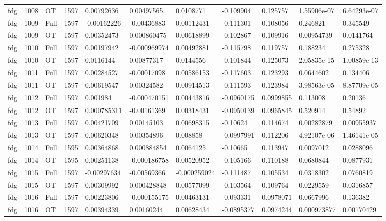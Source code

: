 \begin{landscape}
\begin{longtable}{lllllllllll}
fdg & 1008 & OT & 1597 & 0.00792636 & 0.00497565 & 0.0108771 & -0.109904 & 0.125757 & 1.55906e-07 & 6.64293e-07 \\
fdg & 1009 & Full & 1597 & -0.00162226 & -0.00436883 & 0.00112431 & -0.111301 & 0.108056 & 0.246821 & 0.345549 \\
fdg & 1009 & OT & 1597 & 0.00352473 & 0.000860475 & 0.00618899 & -0.102867 & 0.109916 & 0.00954739 & 0.0141764 \\
fdg & 1010 & Full & 1597 & 0.00197942 & -0.000969974 & 0.00492881 & -0.115798 & 0.119757 & 0.188234 & 0.275328 \\
fdg & 1010 & OT & 1597 & 0.0116144 & 0.00877317 & 0.0144556 & -0.101844 & 0.125073 & 2.05835e-15 & 1.00859e-13 \\
fdg & 1011 & Full & 1597 & 0.00284527 & -0.00017098 & 0.00586153 & -0.117603 & 0.123293 & 0.0644602 & 0.134406 \\
fdg & 1011 & OT & 1597 & 0.00619547 & 0.00324582 & 0.00914513 & -0.111593 & 0.123984 & 3.98563e-05 & 8.87709e-05 \\
fdg & 1012 & Full & 1597 & 0.001984 & -0.000470151 & 0.00443816 & -0.0960175 & 0.0999855 & 0.113008 & 0.20136 \\
fdg & 1012 & OT & 1597 & 0.000785311 & -0.00161369 & 0.00318431 & -0.0950139 & 0.0965845 & 0.520914 & 0.54892 \\
fdg & 1013 & Full & 1597 & 0.00421709 & 0.00145103 & 0.00698315 & -0.10624 & 0.114674 & 0.00282879 & 0.00955937 \\
fdg & 1013 & OT & 1597 & 0.00620348 & 0.00354896 & 0.008858 & -0.0997991 & 0.112206 & 4.92107e-06 & 1.46141e-05 \\
fdg & 1014 & Full & 1595 & 0.00364868 & 0.000884854 & 0.0064125 & -0.10665 & 0.113947 & 0.0097012 & 0.0288096 \\
fdg & 1014 & OT & 1595 & 0.00251138 & -0.000186758 & 0.00520952 & -0.105166 & 0.110188 & 0.0680844 & 0.0877931 \\
fdg & 1015 & Full & 1597 & -0.00297634 & -0.00569366 & -0.000259024 & -0.111487 & 0.105534 & 0.0318302 & 0.0760819 \\
fdg & 1015 & OT & 1597 & 0.00309992 & 0.000428848 & 0.00577099 & -0.103564 & 0.109764 & 0.0229559 & 0.0316857 \\
fdg & 1016 & Full & 1597 & 0.00223806 & -0.000155175 & 0.00463131 & -0.093331 & 0.0978071 & 0.0667996 & 0.136382 \\
fdg & 1016 & OT & 1597 & 0.00394339 & 0.00160244 & 0.00628434 & -0.0895377 & 0.0974244 & 0.000973877 & 0.00170429 \\

\end{longtable}
\end{landscape}
